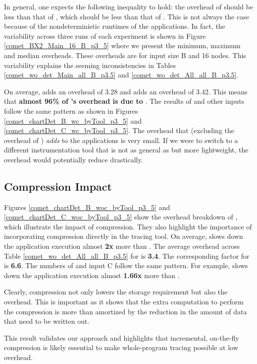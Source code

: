 
In general, one
expects the following inequality to hold:
 the overhead of \pininit should be less than that of \parlot
, which should be less than that of \parlotnc.
%
This is not always the case because of the nondeterministic runtimes of the applications.
%
In fact, the variability across three runs of each experiment
is shown in Figure \ref{comet_BX2_Main_16_B_p3_5}
where we present the minimum, maximum and median overheads.
%
These
overheads are for input size B and 16 nodes.
%
This variability explains the seeming inconsistencies in  Tables
\ref{comet_wo_det_Main_all_B_p3.5} and
\ref{comet_wo_det_All_all_B_p3.5}.


On average, \pininit adds
an overhead of 3.28  and \parlota adds an overhead of 3.42.
%
This means that \textbf{almost 96\%
of \parlota's overhead is due to \pin}.
%
The results of \parlotm and
other inputs follow the same pattern
as shown in Figures \ref{comet_chartDet_B_wc_byTool_p3_5} and \ref{comet_chartDet_C_wc_byTool_p3_5}.
%
The overhead that \parlot (excluding the overhead of \pininit) {\em adds}
to the applications is very small.
%
If we were to switch to a different
instrumentation tool that is not as general as \pin but more
lightweight, the overhead would potentially reduce drastically.


\subsection{Compression Impact}
\label{subsec:compact}

Figures \ref{comet_chartDet_B_woc_byTool_p3_5} and \ref{comet_chartDet_C_woc_byTool_p3_5} show the  overhead breakdown of \parlotnc, which illustrate the impact of compression. They also highlight the importance of incorporating compression directly in the tracing tool.
%
On average, \parlotnc slows down the application execution almost \textbf{2x} more than \parlota.
%
The average overhead
across Table \ref{comet_wo_det_All_all_B_p3.5} for \parlota is \textbf{3.4}.
%
The  corresponding factor for \parlotnc is \textbf{6.6}.
%
The numbers of \parlotm and input C  follow the same pattern. For example, \parlotnc slows down the application execution almost \textbf{1.66x} more than \parlotm.
%

Clearly, compression not only lowers the storage requirement but also the overhead. This is important as it shows that the extra computation to perform the compression is more than amortized by the reduction in the amount of data that need to be written out.
%

This result validates our approach and highlights that incremental, on-the-fly compression is likely essential to make whole-program tracing possible at low overhead.

